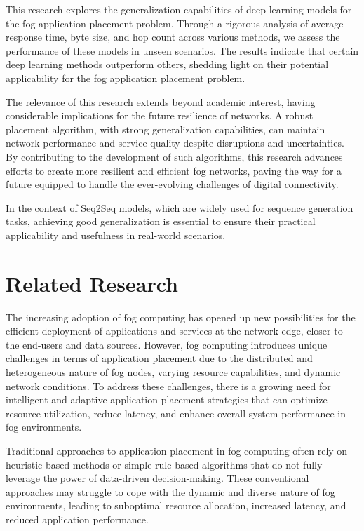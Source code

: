 \documentclass[conference]{IEEEtran}
\begin{document}
This research explores the generalization capabilities of deep learning models for the fog application placement problem. Through a rigorous analysis of average response time, byte size, and hop count across various methods, we assess the performance of these models in unseen scenarios. The results indicate that certain deep learning methods outperform others, shedding light on their potential applicability for the fog application placement problem.

The relevance of this research extends beyond academic interest, having considerable implications for the future resilience of networks. A robust placement algorithm, with strong generalization capabilities, can maintain network performance and service quality despite disruptions and uncertainties. By contributing to the development of such algorithms, this research advances efforts to create more resilient and efficient fog networks, paving the way for a future equipped to handle the ever-evolving challenges of digital connectivity.

In the context of Seq2Seq models, which are widely used for sequence generation tasks, achieving good generalization is essential to ensure their practical applicability and usefulness in real-world scenarios.

\section{Related Research}

The increasing adoption of fog computing has opened up new possibilities for the efficient deployment of applications and services at the network edge, closer to the end-users and data sources. However, fog computing introduces unique challenges in terms of application placement due to the distributed and heterogeneous nature of fog nodes, varying resource capabilities, and dynamic network conditions. To address these challenges, there is a growing need for intelligent and adaptive application placement strategies that can optimize resource utilization, reduce latency, and enhance overall system performance in fog environments.

Traditional approaches to application placement in fog computing often rely on heuristic-based methods or simple rule-based algorithms that do not fully leverage the power of data-driven decision-making. These conventional approaches may struggle to cope with the dynamic and diverse nature of fog environments, leading to suboptimal resource allocation, increased latency, and reduced application performance.
\end{document}
